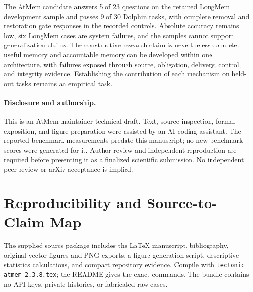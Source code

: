 \documentclass[11pt]{article}
\newcommand{\code}[1]{\texttt{\small #1}}
\begin{document}
The AtMem candidate answers 5 of 23 questions on the retained LongMem development sample and passes 9 of 30 Dolphin tasks, with complete removal and restoration gate responses in the recorded controls. Absolute accuracy remains low, six LongMem cases are system failures, and the samples cannot support generalization claims. The constructive research claim is nevertheless concrete: useful memory and accountable memory can be developed within one architecture, with failures exposed through source, obligation, delivery, control, and integrity evidence. Establishing the contribution of each mechanism on held-out tasks remains an empirical task.

\paragraph{Disclosure and authorship.}
This is an AtMem-maintainer technical draft. Text, source inspection, formal exposition, and figure preparation were assisted by an AI coding assistant. The reported benchmark measurements predate this manuscript; no new benchmark scores were generated for it. Author review and independent reproduction are required before presenting it as a finalized scientific submission. No independent peer review or arXiv acceptance is implied.




\appendix
\section{Reproducibility and Source-to-Claim Map}
The supplied source package includes the LaTeX manuscript, bibliography, original vector figures and PNG exports, a figure-generation script, descriptive-statistics calculations, and compact repository evidence. Compile with \code{tectonic atmem-2.3.8.tex}; the README gives the exact commands. The bundle contains no API keys, private histories, or fabricated raw cases.
\end{document}

